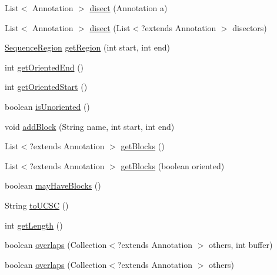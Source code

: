 \begin{DoxyCompactItemize}
\item 
List$<$ Annotation $>$ \hyperlink{classbroad_1_1core_1_1sequence_1_1_sequence_region_a83ee0c9bb9ea259f187a3c172f6f6974}{disect} (Annotation a)
\item 
List$<$ Annotation $>$ \hyperlink{classbroad_1_1core_1_1sequence_1_1_sequence_region_a71a4060a11a5bc98b87550e1c7ba3e3e}{disect} (List$<$?extends Annotation $>$ disectors)
\item 
\hyperlink{classbroad_1_1core_1_1sequence_1_1_sequence_region}{Sequence\+Region} \hyperlink{classbroad_1_1core_1_1sequence_1_1_sequence_region_ab6f99ae47039c2a507e8fefd3d75105a}{get\+Region} (int start, int end)
\item 
int \hyperlink{classbroad_1_1core_1_1sequence_1_1_sequence_region_af96253e8f85e32a8dfceb9eca62eb825}{get\+Oriented\+End} ()
\item 
int \hyperlink{classbroad_1_1core_1_1sequence_1_1_sequence_region_a3f0accf8e2e5997d5d20d5c7696abc5f}{get\+Oriented\+Start} ()
\item 
boolean \hyperlink{classbroad_1_1core_1_1sequence_1_1_sequence_region_ab8be6edb1adc3a624f8361daa51ecbc8}{is\+Unoriented} ()
\item 
void \hyperlink{classbroad_1_1core_1_1sequence_1_1_sequence_region_aa30c8fdd08cf80f019a53f4e44653dca}{add\+Block} (String name, int start, int end)
\item 
List$<$?extends Annotation $>$ \hyperlink{classbroad_1_1core_1_1sequence_1_1_sequence_region_a9d1b1a86babcedd2002d68746ea727e3}{get\+Blocks} ()
\item 
List$<$?extends Annotation $>$ \hyperlink{classbroad_1_1core_1_1sequence_1_1_sequence_region_a301751acfec9b6289156f879d529d76a}{get\+Blocks} (boolean oriented)
\item 
boolean \hyperlink{classbroad_1_1core_1_1sequence_1_1_sequence_region_a3f26953d7f43ec42eafc0456e1896037}{may\+Have\+Blocks} ()
\item 
String \hyperlink{classbroad_1_1core_1_1sequence_1_1_sequence_region_a6c63ce6659d04b07e1fca9f2f9eaabe4}{to\+U\+C\+S\+C} ()
\item 
int \hyperlink{classbroad_1_1core_1_1sequence_1_1_sequence_region_a73892ab0e9b260c5f518481a47fdba82}{get\+Length} ()
\item 
boolean \hyperlink{classbroad_1_1core_1_1sequence_1_1_sequence_region_aec425da29b52689024eaf4c17cd2caa5}{overlaps} (Collection$<$?extends Annotation $>$ others, int buffer)
\item 
boolean \hyperlink{classbroad_1_1core_1_1sequence_1_1_sequence_region_ac78fedd7e16c57868133489c32cb7f10}{overlaps} (Collection$<$?extends Annotation $>$ others)

\end{DoxyCompactItemize}
